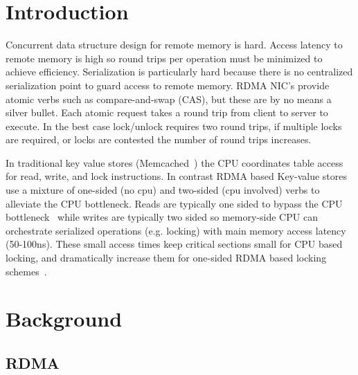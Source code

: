 \section{Introduction}

Concurrent data structure design for remote memory is hard.
Access latency to remote memory is high so round trips per
operation must be minimized to achieve efficiency.
Serialization is particularly hard because there is no
centralized serialization point to guard access to remote
memory. RDMA NIC's provide atomic verbs such as
compare-and-swap (CAS), but these are by no means a silver
bullet.  Each atomic request takes a round trip from client
to server to execute. In the best case lock/unlock requires
two round trips, if multiple locks are required, or locks
are contested the number of round trips increases.

In traditional key value stores (Memcached~\cite{memcached})
the CPU coordinates table access for read, write, and lock
instructions. In contrast RDMA based Key-value
stores~\cite{herd,erpc,pilaf} use a mixture of one-sided (no
cpu) and two-sided (cpu involved) verbs to alleviate the CPU
bottleneck. Reads are typically one sided to bypass the CPU
bottleneck~\cite{pilaf,cell} while writes are typically two
sided so memory-side CPU can orchestrate serialized
operations (e.g. locking) with main memory access latency
(50-100ns).  These small access times keep critical sections
small for CPU based locking, and dramatically increase them
for one-sided RDMA based locking schemes~\cite{clover,
sherman}.
\label{sec:intro}


\section{Background}
\label{sec:background}

\subsection{RDMA}

